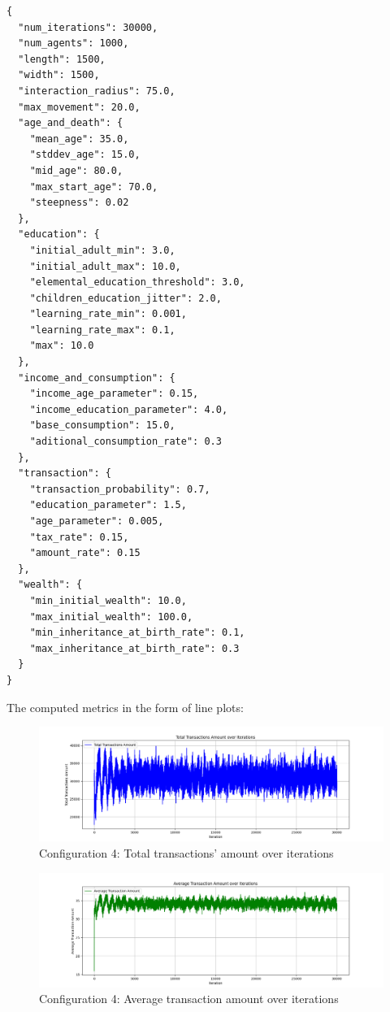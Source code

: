 \documentclass[english]{projectreport}
\begin{document}
    \begin{verbatim}
{
  "num_iterations": 30000,
  "num_agents": 1000,
  "length": 1500,
  "width": 1500,
  "interaction_radius": 75.0,
  "max_movement": 20.0,
  "age_and_death": {
    "mean_age": 35.0,
    "stddev_age": 15.0,
    "mid_age": 80.0,
    "max_start_age": 70.0,
    "steepness": 0.02
  },
  "education": {
    "initial_adult_min": 3.0,
    "initial_adult_max": 10.0,
    "elemental_education_threshold": 3.0,
    "children_education_jitter": 2.0,
    "learning_rate_min": 0.001,
    "learning_rate_max": 0.1,
    "max": 10.0
  },
  "income_and_consumption": {
    "income_age_parameter": 0.15,
    "income_education_parameter": 4.0,
    "base_consumption": 15.0,
    "aditional_consumption_rate": 0.3
  },
  "transaction": {
    "transaction_probability": 0.7,
    "education_parameter": 1.5,
    "age_parameter": 0.005,
    "tax_rate": 0.15,
    "amount_rate": 0.15
  },
  "wealth": {
    "min_initial_wealth": 10.0,
    "max_initial_wealth": 100.0,
    "min_inheritance_at_birth_rate": 0.1,
    "max_inheritance_at_birth_rate": 0.3
  }
}
    \end{verbatim}

    The computed metrics in the form of line plots:

    \begin{figure}[H]
        \centering
        \includegraphics[width=0.8\linewidth]{metrics_config4/metrics_config4_total_transactions_amount.png}
        \caption{Configuration 4: Total transactions' amount over iterations}
        \label{fig:c0-total_transactions_amount}
    \end{figure}

    \begin{figure}[H]
        \centering
        \includegraphics[width=0.8\linewidth]{metrics_config4/metrics_config4_average_transaction_amount.png}
        \caption{Configuration 4: Average transaction amount over iterations}
        \label{fig:c0-average_transaction_amount}
    \end{figure}
\end{document}
